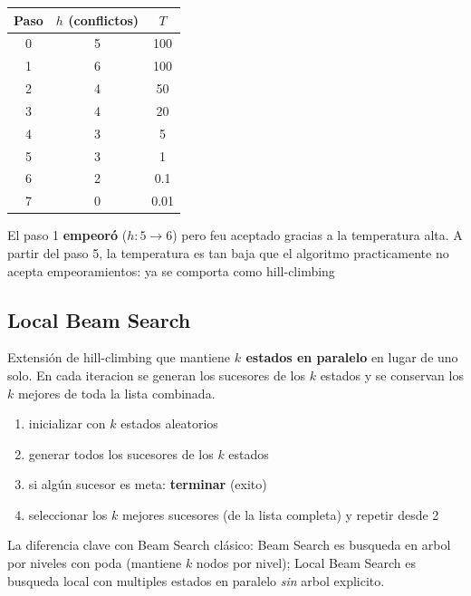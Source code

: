 \begin{example}
    \begin{center}
        \begin{tabular}{ccc}
          \toprule
          Paso & $h$ (conflictos) & $T$ \\
          \midrule
          0 & 5 & 100 \\
          1 & 6 & 100 \\ 
          2 & 4 & 50  \\
          3 & 4 & 20  \\
          4 & 3 & 5   \\
          5 & 3 & 1   \\
          6 & 2 & 0.1 \\
          7 & 0 & 0.01 \\
          \bottomrule
        \end{tabular}
        \end{center}
    El paso 1 \textbf{empeoró} ($h: 5 \to 6$) pero feu aceptado gracias a la temperatura alta. A partir del paso 5, la temperatura es tan baja que el algoritmo practicamente no 
    acepta empeoramientos: ya se comporta como hill-climbing
\end{example}

\subsection{Local Beam Search}

\begin{definition}
    Extensión de hill-climbing que mantiene \textbf{$k$ estados en paralelo} en lugar de uno solo. En cada iteracion se generan los sucesores de los $k$ estados
    y se conservan los $k$ mejores de toda la lista combinada.
    
\end{definition}

\begin{enumerate}
    \item inicializar con $k$ estados aleatorios
    \item generar todos los sucesores de los $k$ estados
    \item si algún sucesor es meta: \textbf{terminar} (exito)
    \item seleccionar los $k$ mejores sucesores (de la lista completa) y repetir desde 2
\end{enumerate}

La diferencia clave con Beam Search clásico: Beam Search es busqueda en arbol por niveles con poda (mantiene $k$ nodos por nivel); Local Beam Search es busqueda local con multiples estados en 
paralelo \emph{sin} arbol explicito.

